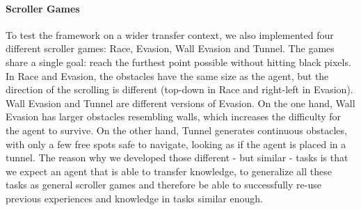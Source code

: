 \paragraph{Scroller Games}
To test the framework on a wider transfer context, we also implemented four different scroller games:
Race, Evasion, Wall Evasion and Tunnel. The games share a single goal: reach the furthest point possible without hitting black pixels. 
In Race and Evasion, the obstacles have the same size as the agent, but the direction of the scrolling is different (top-down in Race and right-left in Evasion). Wall Evasion and Tunnel are different versions of Evasion. 
On the one hand, Wall Evasion has larger obstacles resembling walls, which increases the difficulty for the agent to survive. 
On the other hand, Tunnel generates continuous obstacles, with only a few free spots safe to navigate, looking as if the agent is placed in a tunnel. 
The reason why we developed those different - but similar - tasks is that we expect an agent that is able to transfer knowledge, to generalize all these tasks as general scroller games and therefore be able to successfully re-use previous experiences and knowledge in tasks similar enough.

